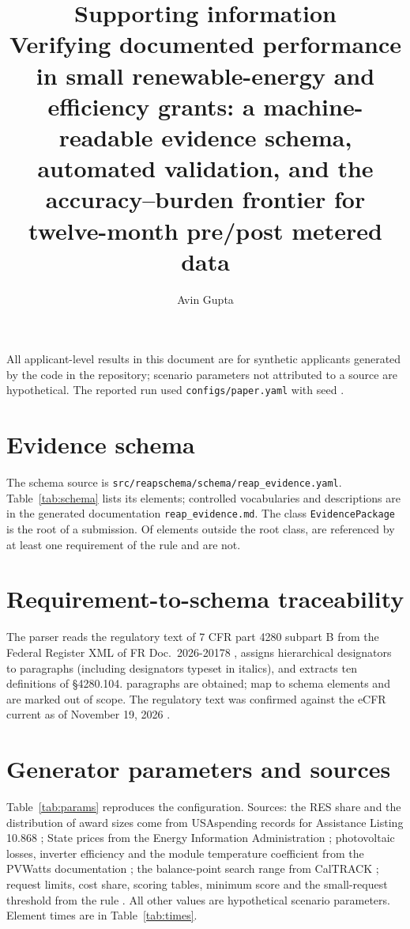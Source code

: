 \documentclass[11pt]{article}
\title{Supporting information\\[4pt]\large Verifying documented performance in small
renewable-energy and efficiency grants: a machine-readable evidence schema, automated
validation, and the accuracy--burden frontier for twelve-month pre/post metered data}
\author{Avin Gupta}
\date{}
\begin{document}
\maketitle

All applicant-level results in this document are for synthetic applicants generated by
the code in the repository; scenario parameters not attributed to a source are
hypothetical. The reported run used \texttt{configs/paper.yaml} with seed \CfgSeed.

\section{Evidence schema}

The schema source is \texttt{src/reapschema/schema/reap\_evidence.yaml}. Table~\ref{tab:schema}
lists its elements; controlled vocabularies and descriptions are in the generated
documentation \texttt{reap\_evidence.md}. The class \texttt{EvidencePackage} is the root
of a submission. Of \SchemaSlots{} elements outside the root class, \SchemaSlotsTraced{}
are referenced by at least one requirement of the rule and \SchemaSlotsBeyondRule{} are
not.

{\footnotesize

}

\section{Requirement-to-schema traceability}

The parser reads the regulatory text of 7 CFR part 4280 subpart B from the Federal
Register XML of FR Doc.\ 2026-20178 \cite{fr2026reap}, assigns hierarchical designators
to paragraphs (including designators typeset in italics), and extracts ten definitions
of \S4280.104. \TraceTotal{} paragraphs are obtained; \TraceEvidence{} map to schema
elements and \TraceOutOfScope{} are marked out of scope. The regulatory text was confirmed
against the eCFR current as of November 19, 2026 \cite{ecfr4280b}.

{\scriptsize

}

\section{Generator parameters and sources}

Table~\ref{tab:params} reproduces the configuration. Sources: the RES share and the
distribution of award sizes come from USAspending records for Assistance Listing 10.868
\cite{usaspending10868}; State prices from the Energy Information Administration
\cite{eia2021prices}; photovoltaic losses, inverter efficiency and the module temperature
coefficient from the PVWatts documentation \cite{dobos2014pvwatts}; the balance-point
search range from CalTRACK \cite{caltrack2methods}; request limits, cost share, scoring
tables, minimum score and the small-request threshold from the rule \cite{fr2026reap}.
All other values are hypothetical scenario parameters. Element times are in
Table~\ref{tab:times}.
\end{document}
